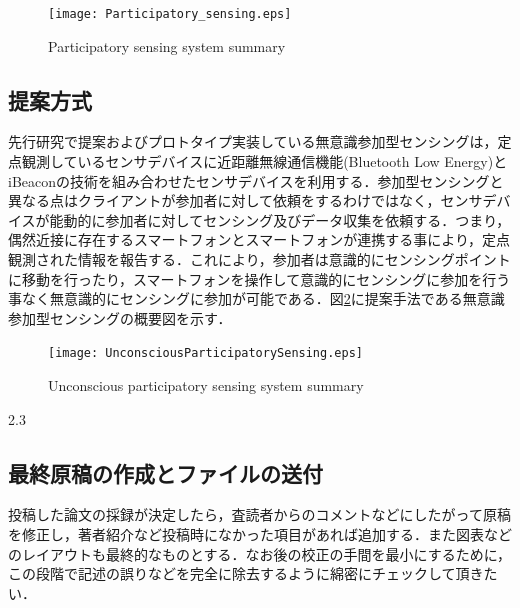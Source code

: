 \documentclass[submit,techrep]{ipsj}
\begin{document}
\begin{figure}[t]
 \begin{center}
  \texttt{[image: Participatory\_sensing.eps]}
 \end{center}
 \caption{Participatory sensing system summary}
 \label{Participatory}
\end{figure}


\subsection{提案方式}
先行研究で提案およびプロトタイプ実装している無意識参加型センシングは，定点観測しているセンサデバイスに近距離無線通信機能(Bluetooth Low Energy)とiBeacon\cite{iBeacon}の技術を組み合わせたセンサデバイスを利用する．参加型センシングと異なる点はクライアントが参加者に対して依頼をするわけではなく，センサデバイスが能動的に参加者に対してセンシング及びデータ収集を依頼する．つまり，偶然近接に存在するスマートフォンとスマートフォンが連携する事により，定点観測された情報を報告する．これにより，参加者は意識的にセンシングポイントに移動を行ったり，スマートフォンを操作して意識的にセンシングに参加を行う事なく無意識的にセンシングに参加が可能である．図\ref{UnconsciousP}に提案手法である無意識参加型センシングの概要図を示す．

\begin{figure}[t]
 \begin{center}
  \texttt{[image: UnconsciousParticipatorySensing.eps]}
 \end{center}
 \caption{Unconscious participatory sensing system summary}
 \label{UnconsciousP}
\end{figure}



2.3
\subsection{最終原稿の作成とファイルの送付}

投稿した論文の採録が決定したら，査読者からのコメントなどにしたがって原稿
を修正し，著者紹介など投稿時になかった項目があれば追加する．また図表など
のレイアウトも最終的なものとする．なお後の校正の手間を最小にするために，
この段階で記述の誤りなどを完全に除去するように綿密にチェックして頂きたい．

\end{document}
